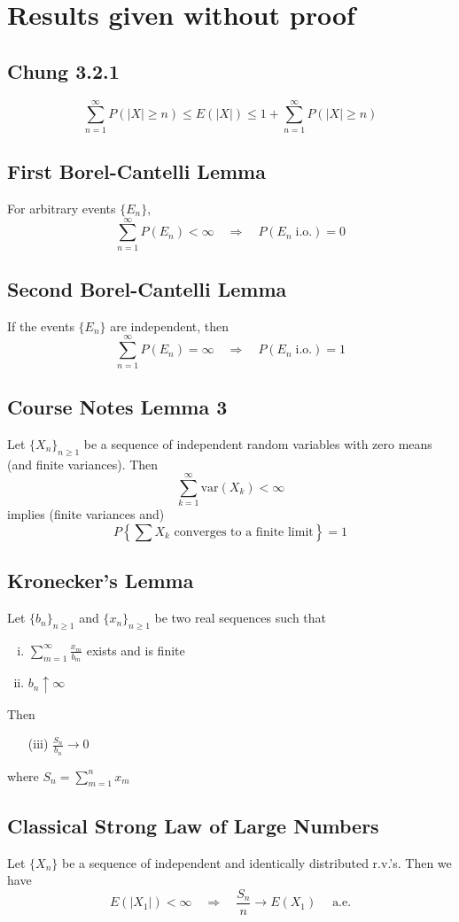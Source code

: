 \documentclass[letterpaper, 12pt]{article}
\renewcommand{\ae}{\;\text{a.e.}}
\newcommand{\io}{\;\text{i.o.}}
\newcommand{\var}{\text{var}}
\newcommand{\skoi}{\sum_{k=1}^\infty}
\newcommand{\smoi}{\sum_{m=1}^\infty}
\newcommand{\snoi}{\sum_{n=1}^\infty}
\begin{document}
\section*{Results given without proof}
\subsection*{Chung 3.2.1}
\[
\snoi P(|X| \geq n) \leq E(|X|) \leq 1+\snoi P(|X| \geq n)
\]


\subsection*{First Borel-Cantelli Lemma} 
For arbitrary events $\{E_n\}$,
\[
\snoi P(E_n) <\infty \quad \Rightarrow \quad P(E_n \io) = 0
\]

\subsection*{Second Borel-Cantelli Lemma} 
If the events $\{E_n\}$ are independent, then
\[
\snoi P(E_n) = \infty \quad\Rightarrow \quad P(E_n \io) = 1
\]

\subsection*{Course Notes Lemma 3}
Let $\{X_n\}_{n\geq 1}$ be a sequence of independent random variables with 	zero means (and finite variances). Then
\[
\skoi \var(X_k) < \infty 
\]
implies (finite variances and)
\[
P\left\{ \sum X_k \text{ converges to a finite limit}   \right\} =1 
\]
\subsection*{Kronecker's Lemma}
Let $\{b_n\}_{n \geq 1}$ and $\{x_n\}_{n \geq 1}$ be two real sequences such that 
\begin{enumerate}[(i)]
\item
$\smoi \frac{x_m}{b_m}$ exists and is finite
\item
$b_n \uparrow \infty$
\end{enumerate}
Then
\begin{enumerate}
\item[(iii)]
$\frac{S_n}{b_n} \to 0$
\end{enumerate}
where $S_n = \sum_{m=1}^nx_m$

\subsection*{Classical Strong Law of Large Numbers}
Let $\{X_n\}$ be a sequence of independent and identically distributed r.v.'s. Then we have
\[
E(|X_1|) < \infty \quad\Rightarrow\quad \frac{S_n}{n} \to E(X_1) \quad \ae
\]
\end{document}
